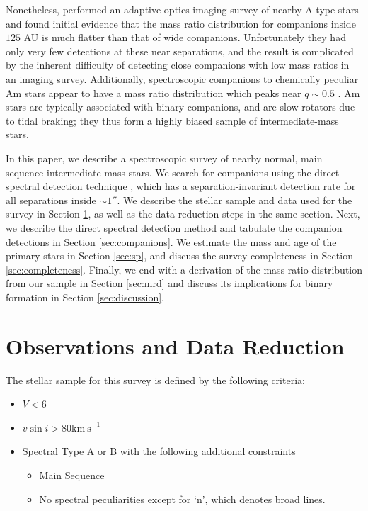 \documentclass{emulateapj}
\begin{document}
Nonetheless, \citet{DeRosa2014} performed an adaptive optics imaging survey of nearby A-type stars and found initial evidence that the mass ratio distribution for companions inside $125$ AU is much flatter than that of wide companions. Unfortunately they had only very few detections at these near separations, and the result is complicated by the inherent difficulty of detecting close companions with low mass ratios in an imaging survey. Additionally, spectroscopic companions to chemically peculiar Am stars appear to have a mass ratio distribution which peaks near $q \sim 0.5$ \citep{Vuissoz2004}. Am stars are typically associated with binary companions, and are slow rotators due to tidal braking; they thus form a highly biased sample of intermediate-mass stars.

In this paper, we describe a spectroscopic survey of nearby normal, main sequence intermediate-mass stars. We search for companions using the direct spectral detection technique \citep{Gullikson2016}, which has a separation-invariant detection rate for all separations inside $\sim 1 ''$. We describe the stellar sample and data used for the survey in Section \ref{sec:obs}, as well as the data reduction steps in the same section. Next, we describe the direct spectral detection method and tabulate the companion detections in Section \ref{sec:companions}. We estimate the mass and age of the primary stars in Section \ref{sec:sp}, and discuss the survey completeness in Section \ref{sec:completeness}. Finally, we end with a derivation of the mass ratio distribution from our sample in Section \ref{sec:mrd} and discuss its implications for binary formation in Section \ref{sec:discussion}.
 


\section{Observations and Data Reduction}
\label{sec:obs}

The stellar sample for this survey is defined by the following criteria:

\begin{itemize}
\item $V < 6$
\item $v\sin{i} > 80 \mathrm{km\ s}^{-1}$
\item Spectral Type A or B with the following additional constraints
\begin{itemize}
  \item Main Sequence
  \item No spectral peculiarities except for `n', which denotes broad lines.
\end{itemize}
\end{itemize}
\end{document}
